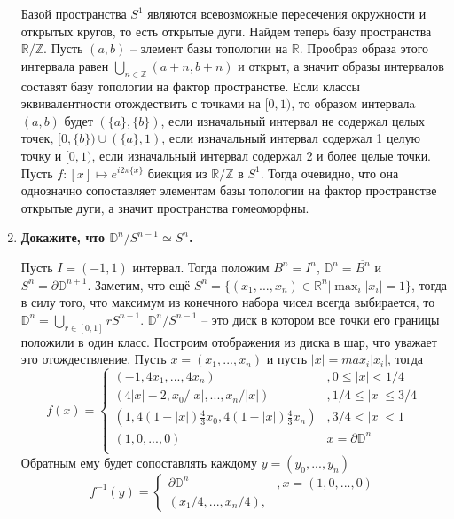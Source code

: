 \documentclass{article}
\begin{document}
\begin{enumerate}
        Базой пространства $S^1$ являются всевозможные пересечения окружности
        и открытых кругов, то есть открытые дуги. Найдем теперь базу
        пространства $\mathbb{R}/\mathbb{Z}$. Пусть $(a,b)$ – элемент базы
        топологии на $\mathbb{R}$. Прообраз образа этого интервала равен
        $\bigcup_{n\in\mathbb{Z}}(a+n,b+n)$ и открыт, а значит образы
        интервалов составят базу топологии на фактор пространстве. Если классы
        эквивалентности отождествить с точками на $[0,1)$, то образом
        интервалa $(a,b)$ будет $(\{a\},\{b\})$, если изначальный интервал не
        содержал целых точек, $[0,\{b\})\cup(\{a\},1)$, если изначальный
        интервал содержал 1 целую точку и $[0,1)$, если изначальный интервал
        содержал 2 и более целые точки. Пусть $f:[x]\mapsto e^{i2\pi\{x\}}$
        биекция из $\mathbb{R}/\mathbb{Z}$ в $S^1$. Тогда очевидно, что она
        однозначно сопоставляет элементам базы топологии на фактор пространстве
        открытые дуги, а значит пространства гомеоморфны.

    \item \textbf{Докажите, что $\mathbb{D}^n/S^{n−1}\simeq S^n$.}\par

        Пусть $I=(-1,1)$ интервал. Тогда положим $B^n=I^n$, $\mathbb{D}^n=
        \overline{B^n}$ и $S^n=\partial\mathbb{D}^{n+1}$. Заметим, что ещё
        $S^n=\{(x_1,...,x_n)\in\mathbb{R}^n|\max_i|x_i|=1\}$, тогда в силу того,
        что максимум из конечного набора чисел всегда выбирается, то
        $\mathbb{D}^n=\bigcup_{r\in[0,1]}rS^{n-1}$. $\mathbb{D}^n/S^{n-1}$ –
        это диск в котором все точки его границы положили в один класс.
        Построим отображения из диска в шар, что уважает это отождествление.
        Пусть $x=(x_1,...,x_n)$ и пусть $|x|=max_i|x_i|$, тогда
        \[f(x)=
        \begin{cases}
            (-1,4x_1,...,4x_n) &,0\leqslant|x|<1/4\\
            (4|x|-2,x_0/|x|,...,x_n/|x|) &,1/4\leqslant|x|\leqslant 3/4\\
            (1,4(1-|x|)\frac{4}{3}x_0,4(1-|x|)\frac{4}{3}x_n) &,3/4<|x|<1\\
            (1,0,...,0) &x=\partial\mathbb{D}^n\\
        \end{cases}\]
        Обратным ему будет сопоставлять каждому $y=(y_0,...,y_n)$
        \[f^{-1}(y)=
        \begin{cases}
            \partial\mathbb{D}^n &,x=(1,0,...,0)\\
            (x_1/4,...,x_n/4),
        \end{cases}\]



\end{enumerate}
\end{document}
